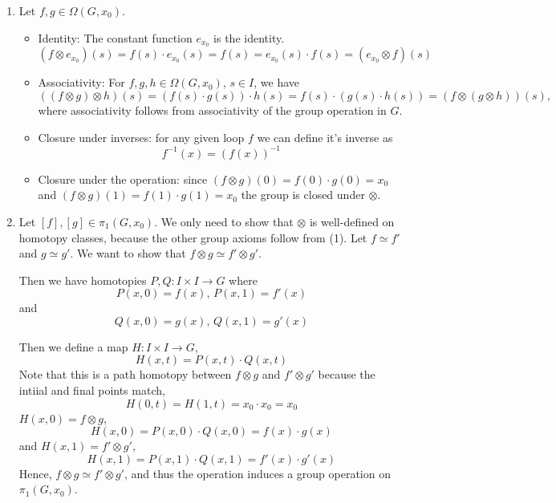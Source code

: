 \documentclass[12pt]{article}
\begin{document}
\begin{solution}
    \bbni 
    \begin{enumerate}
        \item Let $f, g \in \Omega(G, x_0)$.
        \begin{itemize}
            \item Identity: The constant function $e_{x_0}$ is the identity. 
            \[(f \otimes e_{x_0})(s) = f(s) \cdot e_{x_0}(s) = f(s) = e_{x_0} (s)\cdot f(s) = (e_{x_0} \otimes f)(s) \]

            \item  Associativity: For $f,g,h \in \Omega(G,x_0)$, $s \in I$, we have
            \[
            ((f \otimes g)\otimes h)(s)
            = (f(s)\cdot g(s))\cdot h(s)
            = f(s)\cdot (g(s)\cdot h(s))
            = (f \otimes (g \otimes h))(s),
            \]
            where associativity follows from associativity of the group operation in $G$.
            \item Closure under inverses: for any given loop $f$ we can define it's inverse as
            \[f^{-1}(x) = (f(x))^{-1}\]

            \item Closure under the operation: since $(f \otimes g)(0) = f(0)\cdot g(0) = x_0$ and $(f \otimes g)(1) = f(1)\cdot g(1) = x_0$ the group is closed under $\otimes$.
        \end{itemize}

        \item Let $[f], [g] \in \pi_1(G, x_0)$. We only need to show that $\otimes$ is well-defined on homotopy classes, because the other group axioms follow from (1). Let $f \simeq f'$ and $g \simeq g'$. We want to show that $f \otimes g \simeq f' \otimes g'$. 
        
        Then we have homotopies $P, Q: I \times I \to G$ where 
        \[P(x,0) = f(x), \, P(x,1) =f'(x)\]  
        and \[Q(x,0) = g(x), \, Q(x,1) = g'(x)\]

        Then we define a map $H: I \times I \to G$, 
        \[H(x, t) = P(x,t) \cdot Q(x,t)\]
        Note that this is a path homotopy between $f \otimes g $ and $f' \otimes g'$ because the intiial and final points match,
        \[H(0,t) = H(1, t) = x_0 \cdot x_0 = x_0\] 
        $H(x,0) = f \otimes g$,  
        \[H(x, 0) = P(x,0) \cdot Q(x,0) = f(x)\cdot g(x)\] 
        and $H(x,1) = f' \otimes g'$,
        \[H(x, 1) = P(x,1) \cdot Q(x,1) = f'(x)\cdot g'(x)\] 
        Hence, $f \otimes g \simeq f' \otimes g'$, and thus the operation induces a group operation on $\pi_1(G, x_0)$. 


\end{enumerate}
\end{solution}
\end{document}
